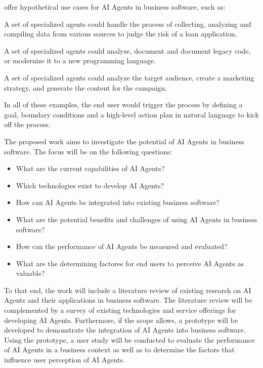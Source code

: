 \documentclass[
  paper=a4,
  parskip=half,
  fontsize=12pt,
  listof=toc,
  titlepage,
  headsepline,
  footsepline,
]{scrartcl}
\begin{document}
\cite{mckinsey_why-ai-agents} offer hypothetical use cases for AI Agents in business software, such as:
\begin{description}[font=\small\bfseries]
  \item[Loan underwriting] A set of specialized agents could handle the process of collecting, analyzing and compiling data from various sources to judge the risk of a loan application.
  \item[Code documentation and modernization] A set of specialized agents could analyze, document and document legacy code, or modernize it to a new programming language.
  \item[Online marketing capaign creation] A set of specialized agents could analyze the target audience, create a marketing strategy, and generate the content for the campaign.
\end{description}
In all of these examples, the end user would trigger the process by defining a goal, boundary conditions and a high-level action plan in natural language to kick off the process.

The proposed work aims to investigate the potential of AI Agents in business software.
The focus will be on the following questions:

\begin{itemize}
  \item What are the current capabilities of AI Agents?
  \item Which technologies exist to develop AI Agents?
  \item How can AI Agents be integrated into existing business software?
  \item What are the potential benefits and challenges of using AI Agents in business software?
  \item How can the performance of AI Agents be measured and evaluated?
  \item What are the determining factores for end users to perceive AI Agents as valuable?
\end{itemize}

To that end, the work will include a literature review of existing research on AI Agents and their applications in business software.
The literature review will be complemented by a survey of existing technologies and service offerings for developing AI Agents.
Furthermore, if the scope allows, a prototype will be developed to demonstrate the integration of AI Agents into business software.
Using the prototype, a user study will be conducted to evaluate the performance of AI Agents in a business context as well as to determine the factors that influence user perception of AI Agents.
\end{document}
